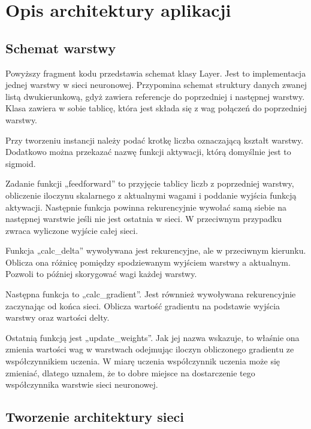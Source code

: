     \chapter{Opis architektury aplikacji}\label{ch:opisArchitekturyAplikacji}

    \section{Schemat warstwy}\label{sec:schematWarstwy}


    Powyższy fragment kodu przedstawia schemat klasy Layer.
    Jest to implementacja jednej warstwy w sieci neuronowej.
    Przypomina schemat struktury danych zwanej listą dwukierunkową, gdyż zawiera referencje do poprzedniej i następnej warstwy.
    Klasa zawiera w sobie tablicę, która jest składa się z wag połączeń do poprzedniej warstwy.

    Przy tworzeniu instancji należy podać krotkę liczba oznaczającą kształt warstwy.
    Dodatkowo można przekazać nazwę funkcji aktywacji, którą domyślnie jest to sigmoid.

    Zadanie funkcji „feedforward” to przyjęcie tablicy liczb z poprzedniej warstwy, obliczenie iloczynu skalarnego z aktualnymi wagami i poddanie wyjścia funkcją aktywacji.
    Następnie funkcja powinna rekurencyjnie wywołać samą siebie na następnej warstwie jeśli nie jest ostatnia w sieci.
    W przeciwnym przypadku zwraca wyliczone wyjście całej sieci.

    Funkcja „calc\_delta” wywoływana jest rekurencyjne, ale w przeciwnym kierunku.
    Oblicza ona różnicę pomiędzy spodziewanym wyjściem warstwy a aktualnym.
    Pozwoli to później skorygować wagi każdej warstwy.

    Następna funkcja to „calc\_gradient”.
    Jest równnież wywoływana rekurencyjnie zaczynając od końca sieci.
    Oblicza wartość gradientu na podstawie wyjścia warstwy oraz wartości delty.

    Ostatnią funkcją jest „update\_weights”.
    Jak jej nazwa wskazuje, to właśnie ona zmienia wartości wag w warstwach odejmując iloczyn obliczonego gradientu ze współczynnikiem uczenia.
    W miarę uczenia współczynnik uczenia może się zmieniać, dlatego uznałem, że to dobre miejsce na dostarczenie tego współczynnika warstwie sieci neuronowej.

    \section{Tworzenie architektury sieci}\label{sec:tworzenieArchitekturySieci}

